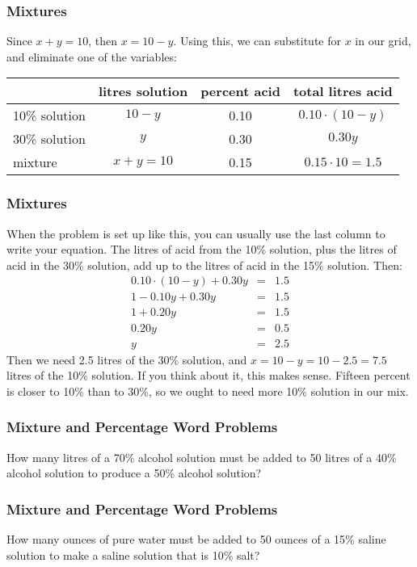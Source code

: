 \documentclass[xcolor=dvipsnames]{beamer}
\begin{document}
\begin{frame}
  \frametitle{Mixtures}
  Since $x+y=10$, then $x=10-y$. Using this, we can substitute for $x$
  in our grid, and eliminate one of the variables:

  \bigskip

  \begin{tabular}{|l|c|c|c|}\hline
    & litres solution & percent acid & total litres acid \\ \hline
    10\% solution & $10-y$ & 0.10 & $0.10\cdot(10-y)$ \\ \hline
    30\% solution & $y$ & 0.30 & $0.30y$ \\ \hline
    mixture & $x+y=10$ & 0.15 & $0.15\cdot{}10=1.5$ \\ \hline
  \end{tabular}
\end{frame}

\begin{frame}
  \frametitle{Mixtures}
  When the problem is set up like this, you can usually use the last
  column to write your equation. The litres of acid from the 10\%
  solution, plus the litres of acid in the 30\% solution, add up to
  the litres of acid in the 15\% solution. Then:
  \begin{equation}
    \label{eq:voocoshi}
    \begin{array}{rcl}
      0.10\cdot(10-y)+0.30y&=&1.5 \\
      1-0.10y+0.30y&=&1.5 \\
      1+0.20y&=&1.5 \\
      0.20y&=&0.5 \\
      y&=&2.5
    \end{array}
  \end{equation}
  Then we need 2.5 litres of the 30\% solution, and
  $x=10-y=10-2.5=7.5$ litres of the 10\% solution. If you think about
  it, this makes sense. Fifteen percent is closer to 10\% than to
  30\%, so we ought to need more 10\% solution in our mix.
\end{frame}

\begin{frame}
  \frametitle{Mixture and Percentage Word Problems}
  {\ubung} How many litres of a 70\% alcohol solution must be added to
  50 litres of a 40\% alcohol solution to produce a 50\% alcohol
  solution?
\end{frame}

\begin{frame}
  \frametitle{Mixture and Percentage Word Problems}
  {\ubung} How many ounces of pure water must be added to 50 ounces of
  a 15\% saline solution to make a saline solution that is 10\% salt?
\end{frame}
\end{document}
